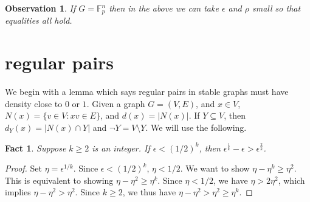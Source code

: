 \documentclass[11pt]{article}
\newtheorem{observation}{Observation}
\newtheorem{fact}{Fact}
\theoremstyle{definition}
\begin{document}
\begin{observation}
If $G=\mathbb{F}_p^n$ then in the above we can take $\epsilon$ and $\rho$ small so that equalities all hold.
\end{observation}

\section{regular pairs}

We begin with a lemma which says regular pairs in stable graphs must have density close to $0$ or $1$. Given a graph $G=(V,E)$, and $x\in V$, $N(x)=\{v\in V: xv\in E\}$, and $d(x)=|N(x)|$.  If $Y\subseteq V$, then $d_Y(x)=|N(x)\cap Y|$ and $\neg Y=V\setminus Y$.  We will use the following.

\begin{fact}\label{fact0}
Suppose $k\geq 2$ is an integer. If $\epsilon<(1/2)^k$, then $\epsilon^{\frac{1}{k}}-\epsilon>\epsilon^{\frac{2}{k}}$.
\end{fact}
\begin{proof}
Set $\eta=\epsilon^{1/k}$.  Since $\epsilon<(1/2)^k$, $\eta<1/2$.  We want to show $\eta -\eta^k \geq \eta^2$.  This is equivalent to showing $\eta -\eta^2\geq \eta^k$.  Since $\eta<1/2$, we have $\eta>2\eta^2$, which implies $\eta -\eta^2>\eta^2$. Since $k\geq 2$, we thus have $\eta -\eta^2>\eta^2\geq \eta^k$.
\end{proof}
\end{document}
